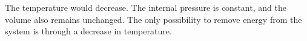 The temperature would decrease. The internal pressure is constant, and the volume also remains unchanged. The only possibility to remove energy from the system is through a decrease in temperature.
